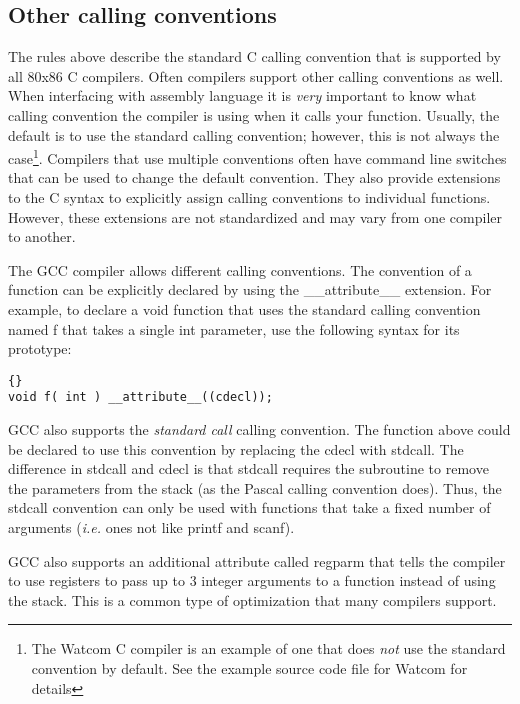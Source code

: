 \subsection{Other calling conventions}

The rules above describe the standard C calling convention that is
supported by all 80x86 C compilers. Often compilers support other
calling conventions as well. When interfacing with assembly language
it is \emph{very} important to know what calling convention the
compiler is using when it calls your function. Usually, the default is
to use the standard calling convention; however, this is not always
the case\footnote{The Watcom C compiler is an
example of one that does \emph{not} use the standard convention by
default. See the example source code file for Watcom for details}.
Compilers that use multiple conventions often have command line
switches that can be used to change the default convention.  They also
provide extensions to the C syntax to explicitly assign calling
conventions to individual functions. However, these extensions are not
standardized and may vary from one compiler to another.

The GCC compiler allows different calling conventions. The convention
of a function can be explicitly declared by using the {\code
\_\_attribute\_\_} extension. For example,
to declare a void function that uses the standard calling convention
 named {\code f} that takes a single
{\code int} parameter, use the following syntax for its prototype:
\begin{lstlisting}[stepnumber=0]{}
void f( int ) __attribute__((cdecl));
\end{lstlisting}
GCC also supports the \emph{standard call}  calling convention. The function above could be
declared to use this convention by replacing the {\code cdecl} with
{\code stdcall}. The difference in {\code stdcall} and {\code cdecl}
is that {\code stdcall} requires the subroutine to remove the
parameters from the stack (as the Pascal calling convention
does). Thus, the {\code stdcall} convention can only be used with
functions that take a fixed number of arguments (\emph{i.e.} ones not
like {\code printf} and {\code scanf}).

GCC also supports an additional attribute called {\code regparm}
 that tells the compiler to use
registers to pass up to 3 integer arguments to a function instead of
using the stack. This is a common type of optimization that many
compilers support.

